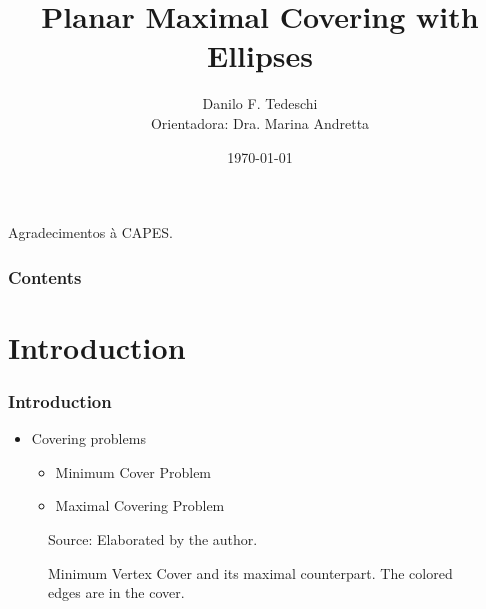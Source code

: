 \documentclass{beamer}
\title[Qualificação de Mestrado]{Planar Maximal Covering with Ellipses}
\author[Tedeschi, D. F.]{Danilo F. Tedeschi\\ \small Orientadora: Dra. Marina Andretta}
\institute[ICMC]{Instituto de Ciências Matemáticas e Computação}
\date{\today}
\newcommand{\source}[1]{\caption*{Source: {#1}} }
\begin{document}
\begin{frame}
 \maketitle
 
 
\centering Agradecimentos à CAPES.
\end{frame}

\begin{frame}
\frametitle{Contents}
 \tableofcontents
\end{frame}

\section{Introduction}
\begin{frame}
\frametitle{Introduction}
\begin{itemize}
	\item Covering problems
	\begin{itemize}
		\item Minimum Cover Problem \autocite{karp}
		\item Maximal Covering Problem \autocite{church:1974}
	\end{itemize}

\end{itemize}

\begin{figure}
	\caption{Minimum Vertex Cover and its maximal counterpart. The colored edges are in the cover.}
	
	
	\source{Elaborated by the author.}
\end{figure}
\end{frame}
\end{document}
